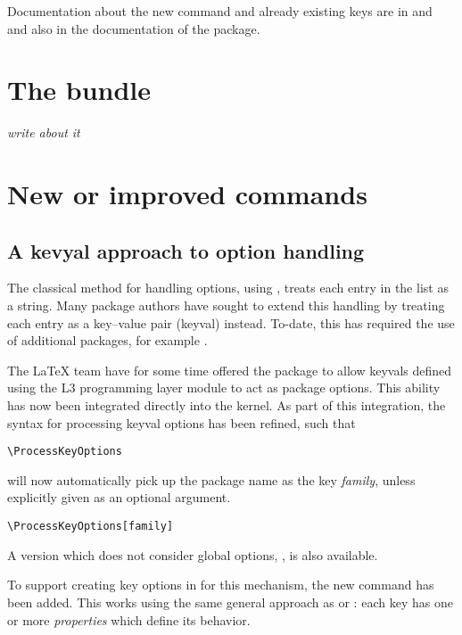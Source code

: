 \documentclass{ltnews}
\begin{document}
Documentation about the new command and
already existing keys are in  and 
and also in the documentation of the  package.


\section{The  bundle}

\emph{write about it}




\section{New or improved commands}

\subsection{A kevyal approach to option handling}

The classical \LaTeXe{} method for handling options, using ,
treats each entry in the list as a string. Many package authors have sought to
extend this handling by treating each entry as a key--value pair (keyval)
instead. To-date, this has required the use of additional packages, for example
.

The \LaTeX{} team have for some time offered the package  to
allow keyvals defined using the L3 programming layer module  to act
as package options. This ability has now been integrated directly into the
kernel. As part of this integration, the syntax for processing keyval options
has been refined, such that
\begin{verbatim}
\ProcessKeyOptions
\end{verbatim}
will now automatically pick up the package name as the key \emph{family},
unless explicitly given as an optional argument.
\begin{verbatim}
\ProcessKeyOptions[family]
\end{verbatim}
A version which does not consider global options,
, is also available.

To support creating key options in for this mechanism, the new command
 has been added. This works using the same general
approach as  or : each key has one or more
\emph{properties} which define its behavior.
\end{document}
